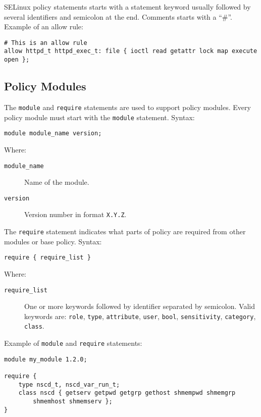 SELinux policy statements starts with a statement keyword usually followed by
several identifiers and semicolon at the end. Comments starts with a ``\#''.
Example of an allow rule:

\begin{lstlisting}
# This is an allow rule
allow httpd_t httpd_exec_t: file { ioctl read getattr lock map execute open };
\end{lstlisting}

\subsection{Policy Modules}

The \texttt{module} and \texttt{require} statements are used to support policy
modules. Every policy module must start with the \texttt{module} statement.
Syntax:
\begin{lstlisting}
module module_name version;
\end{lstlisting}
Where:
\begin{description}
    \item [\texttt{module\_name}] Name of the module.
    \item [\texttt{version}] Version number in format \texttt{X.Y.Z}.
\end{description}

The \texttt{require} statement indicates what parts of policy are required from
other modules or base policy. Syntax:
\begin{lstlisting}
require { require_list }
\end{lstlisting}
Where:
\begin{description}
    \item [\texttt{require\_list}] One or more keywords followed by identifier
        separated by semicolon. Valid keywords are: \texttt{role},
        \texttt{type}, \texttt{attribute}, \texttt{user}, \texttt{bool},
        \texttt{sensitivity}, \texttt{category}, \texttt{class}.
\end{description}

Example of \texttt{module} and \texttt{require} statements:
\begin{lstlisting}
module my_module 1.2.0;

require {
    type nscd_t, nscd_var_run_t;
    class nscd { getserv getpwd getgrp gethost shmempwd shmemgrp
        shmemhost shmemserv };
}
\end{lstlisting}

